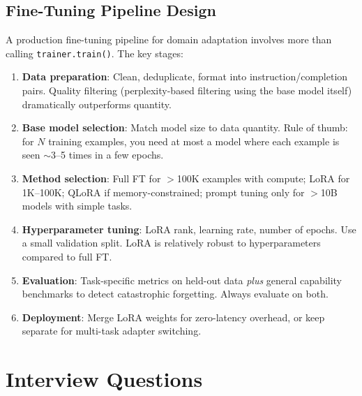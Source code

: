 \subsection{Fine-Tuning Pipeline Design}

A production fine-tuning pipeline for domain adaptation involves more than calling \texttt{trainer.train()}. The key stages:

\begin{enumerate}
    \item \textbf{Data preparation}: Clean, deduplicate, format into instruction/completion pairs. Quality filtering (perplexity-based filtering using the base model itself) dramatically outperforms quantity.
    \item \textbf{Base model selection}: Match model size to data quantity. Rule of thumb: for $N$ training examples, you need at most a model where each example is seen $\sim$3--5 times in a few epochs.
    \item \textbf{Method selection}: Full FT for $>$100K examples with compute; LoRA for 1K--100K; QLoRA if memory-constrained; prompt tuning only for $>$10B models with simple tasks.
    \item \textbf{Hyperparameter tuning}: LoRA rank, learning rate, number of epochs. Use a small validation split. LoRA is relatively robust to hyperparameters compared to full FT.
    \item \textbf{Evaluation}: Task-specific metrics on held-out data \textit{plus} general capability benchmarks to detect catastrophic forgetting. Always evaluate on both.
    \item \textbf{Deployment}: Merge LoRA weights for zero-latency overhead, or keep separate for multi-task adapter switching.
\end{enumerate}

\section{Interview Questions}
\label{sec:transfer_interview}

